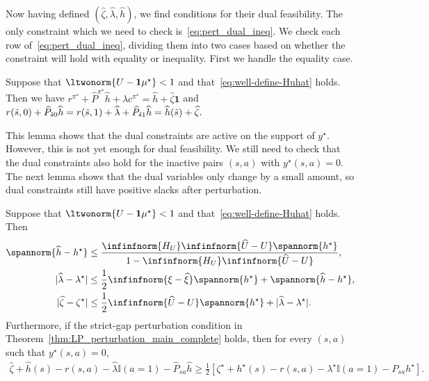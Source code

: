 \documentclass[mnsc,nonblindrev]{informs3}
\newcommand{\Phat}{\widehat{P}}
\newcommand{\one}{\mathbf{1}}
\newcommand{\pistar}{\pi^\star}
\newcommand{\hhat}{\widehat{h}}
\newcommand{\uhat}{\widehat{U}}
\newcommand{\xihat}{\widehat{\xi}}
\newcommand{\zetahat}{\widehat{\zeta}}
\newcommand{\lambdahat}{\widehat{\lambda}}
\begin{document}
Now having defined $(\zetahat, \lambdahat, \hhat)$, we find conditions for their dual feasibility. The only constraint which we need to check is~\eqref{eq:pert_dual_ineq}. We check each row of~\eqref{eq:pert_dual_ineq}, dividing them into two cases based on whether the constraint will hold with equality or inequality. First we handle the equality case.

\begin{lemma}
\label{lem:pert_dual_LP_equality_rows}
    Suppose that $\ltwonorm{U - \one \mu^\star} < 1$ and that~\eqref{eq:well-define-Huhat} holds. Then we have
    $
        r^{\pistar} + \Phat^{\pistar} \hhat + \lambdahat c^{\pistar}=\hhat+\zetahat\one
    $
    and
    $
        r(\tilde{s},0) + \Phat_{\Tilde{s}0} \hhat = r(\tilde{s},1) + \lambdahat + \Phat_{\Tilde{s}1} \hhat = \hhat(\Tilde{s})+\zetahat.
    $
\end{lemma}
This lemma shows that the dual constraints are active on the support of \(y^\star\). 
However, this is not yet enough for dual feasibility. We still need to
check that the dual constraints also hold for the inactive pairs
\((s,a)\) with \(y^\star(s,a)=0\). The next lemma
shows that the dual variables only change by a small amount, so dual constraints still have positive slacks after perturbation.
\begin{lemma}
\label{lem:main-perturbed-dual}
\label{lem:main-dual-gap-preservation}
\label{lem:pert_dual_LP_ineq_consts}
Suppose that \(\ltwonorm{U-\one\mu^\star}<1\) and
that~\eqref{eq:well-define-Huhat} holds. Then
\begin{align*}
    \spannorm{\hhat-h^\star}
    &\le
    \frac{\infinfnorm{H_U}\infinfnorm{\uhat-U}\spannorm{h^\star}}
    {1-\infinfnorm{H_U}\infinfnorm{\uhat-U}},\\
    |\lambdahat-\lambda^\star|
    &\le
    \frac12\infinfnorm{\xi-\xihat}\spannorm{h^\star}
    +\spannorm{\hhat-h^\star},\\
    |\zetahat-\zeta^\star|
    &\le
    \frac12\infinfnorm{\uhat-U}\spannorm{h^\star}
    +|\lambdahat-\lambda^\star|.
\end{align*}
Furthermore, if the strict-gap perturbation condition in
Theorem~\ref{thm:LP_perturbation_main_complete} holds, then for every
\((s,a)\) such that \(y^\star(s,a)=0\),
\[
\begin{aligned}
\zetahat+\hhat(s)-r(s,a)
-\lambdahat\mathbb I(a=1)-\Phat_{sa}\hhat
\ge
\frac12\left[
\zeta^\star+h^\star(s)-r(s,a)
-\lambda^\star\mathbb I(a=1)-P_{sa}h^\star
\right].
\end{aligned}
\]
\end{lemma}
\end{document}
